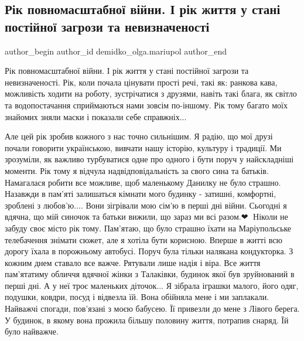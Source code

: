  
 
 
 
 

\subsection{Рік повномасштабної війни. І рік життя  у стані постійної загрози та невизначеності}
\label{sec:24_02_2023.fb.demidko_olga.mariupol.1.rik_vijny_rik_zhyttja}

\ifcmt
 author_begin
   author_id demidko_olga.mariupol
 author_end
\fi

Рік повномасштабної війни. І рік життя  у стані постійної загрози та
невизначеності. Рік, коли почала цінувати прості речі, такі як: ранкова кава,
можливість ходити на роботу, зустрічатися з друзями, навіть такі блага, як
світло та водопостачання сприймаються нами зовсім по-іншому. Рік тому багато
моїх знайомих зняли маски і показали себе справжніх... 

Але цей рік зробив кожного з нас точно сильнішим. Я радію, що мої друзі почали
говорити українською, вивчати нашу історію, культуру і традиції. Ми зрозуміли,
як важливо турбуватися одне про одного і бути поруч у найскладніші моменти. Рік
тому я відчула надвідповідальність за свого сина та батьків. Намагалася робити
все можливе, щоб маленькому Данилку не було страшно. Назавжди в пам'яті
залишаться кімнати мого будинку - затишні, комфортні, зроблені з любов'ю....
Вони зігрівали мою сім'ю в перші дні війни. Сьогодні я вдячна, що мій синочок
та батьки  вижили, що зараз ми всі разом.❤🙏 Ніколи не забуду своє місто рік
тому. Пам'ятаю, що було страшно їхати на Маріупольське телебачення знімати
сюжет, але я хотіла бути корисною. Вперше в житті всю дорогу їхала в порожньому
автобусі. Поруч була тільки налякана кондукторка. З кожним днем ставало все
важче. Рятували лише надія і віра. Все життя пам'ятатиму обличчя вдячної жінки
з Талаківки, будинок якої був зруйнований в перші дні. А у неї троє маленьких
діточок... Я зібрала іграшки малого, його одяг, подушки, ковдри, посуд і
відвезла їй. Вона обійняла мене і ми заплакали. Найважчі спогади, пов'язані з
моєю бабусею. Її привезли до мене з Лівого берега. У будинок, в якому вона
прожила більшу половину життя, потрапив снаряд. Їй було найважче.

